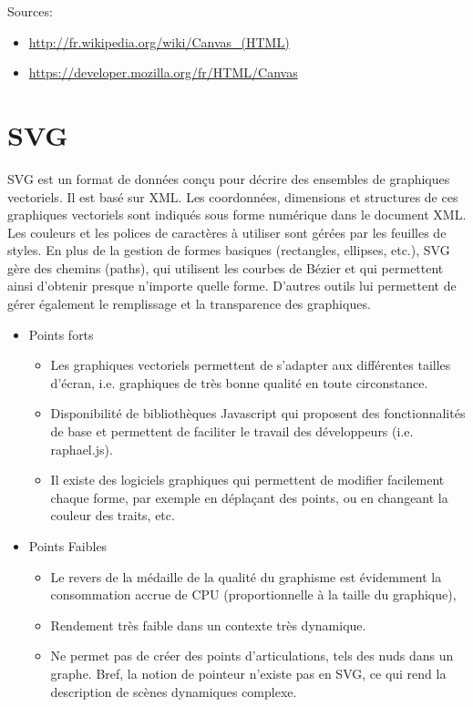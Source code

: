 \documentclass[a4paper,10pt]{report}
\begin{document}
 Sources:
\begin{itemize}
\item \url{http://fr.wikipedia.org/wiki/Canvas_(HTML)}
\item \url{https://developer.mozilla.org/fr/HTML/Canvas}
\end{itemize} 
	  

\section{SVG}
SVG est un format de données conçu pour décrire des ensembles de graphiques vectoriels. 
Il est basé sur XML. Les coordonnées, dimensions et structures de ces graphiques 
vectoriels sont indiqués sous forme numérique dans le document XML. 
Les couleurs et les polices de caractères à utiliser sont gérées par 
les feuilles de styles. 
En plus de la gestion de formes basiques (rectangles, ellipses, etc.), SVG gère
 des chemins (paths), qui utilisent les courbes de Bézier et qui permettent ainsi
 d'obtenir presque n'importe quelle forme.  D'autres outils lui permettent de gérer 
également le remplissage et la transparence des graphiques.

\begin{itemize}
\item Points forts
\begin{itemize}
\item Les graphiques vectoriels permettent de s'adapter aux différentes tailles d'écran, 
i.e. graphiques de très bonne qualité en toute circonstance.
\item Disponibilité de bibliothèques Javascript qui proposent des fonctionnalités de base 
et permettent de faciliter le travail des développeurs (i.e. raphael.js).
\item Il existe des logiciels graphiques qui permettent de modifier facilement chaque
 forme, par exemple en déplaçant des points, ou en changeant la couleur des traits, etc.
\end{itemize}
\item Points Faibles
\begin{itemize}
\item Le revers de la médaille de la qualité du graphisme est évidemment la consommation 
accrue de CPU (proportionnelle à la taille du graphique),
\item Rendement très faible dans un contexte très dynamique.
\item Ne permet pas de créer des points d'articulations, tels des nuds dans un graphe. 
Bref, la notion de pointeur n'existe pas en SVG, ce qui rend la description de scènes 
dynamiques complexe.
\end{itemize} 
\end{itemize} 
\end{document}
